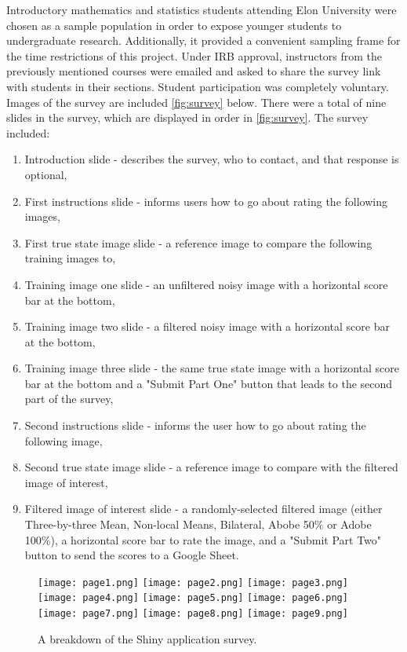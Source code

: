 \documentclass{ncjms}
\begin{document}
Introductory mathematics and statistics students attending Elon University were chosen as a sample population in order to expose younger students to undergraduate research. Additionally, it provided a convenient sampling frame for the time restrictions of this project. Under IRB approval, instructors from the previously mentioned courses were emailed and asked to share the survey link with students in their sections. Student participation was completely voluntary. Images of the survey are included \autoref{fig:survey} below. There were a total of nine slides in the survey, which are displayed in order in \autoref{fig:survey}. The survey included:
\begin{enumerate}
  \item Introduction slide - describes the survey, who to contact, and that response is optional,
  \item First instructions slide - informs users how to go about rating the following images,
  \item First true state image slide - a reference image to compare the following training images to,
  \item Training image one slide - an unfiltered noisy image with a horizontal score bar at the bottom,
  \item Training image two slide - a filtered noisy image with a horizontal score bar at the bottom,
  \item Training image three slide - the same true state image with a horizontal score bar at the bottom and a "Submit Part One" button that leads to the second part of the survey,
  \item Second instructions slide - informs the user how to go about rating the following image,
  \item Second true state image slide - a reference image to compare with the filtered image of interest,
  \item Filtered image of interest slide - a randomly-selected filtered image (either Three-by-three Mean, Non-local Means, Bilateral, Abobe 50\% or Adobe 100\%), a horizontal score bar to rate the image, and a "Submit Part Two" button to send the scores to a Google Sheet.
\end{enumerate}

\begin{figure}[ht]
  \centering
    \texttt{[image: page1.png]}
    \texttt{[image: page2.png]}
    \texttt{[image: page3.png]}
    \texttt{[image: page4.png]}
    \texttt{[image: page5.png]}
    \texttt{[image: page6.png]}
    \texttt{[image: page7.png]}
    \texttt{[image: page8.png]}
    \texttt{[image: page9.png]}
  \caption{A breakdown of the Shiny application survey.}
  \label{fig:survey}
\end{figure}
\end{document}
